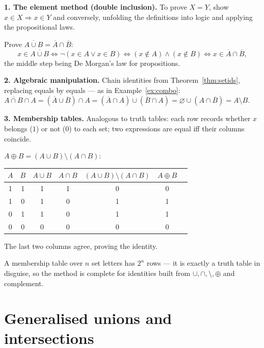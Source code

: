 \textbf{1. The element method (double inclusion).} To prove $X = Y$, show
$x \in X \Rightarrow x \in Y$ and conversely, unfolding the definitions into
logic and applying the propositional laws.

\begin{example}
Prove $\overline{A \cup B} = \overline{A} \cap \overline{B}$:
\[
x \in \overline{A \cup B}
\iff \neg(x \in A \vee x \in B)
\iff (x \notin A) \wedge (x \notin B)
\iff x \in \overline{A} \cap \overline{B},
\]
the middle step being De Morgan's law for propositions.
\end{example}

\textbf{2. Algebraic manipulation.} Chain identities from
Theorem~\ref{thm:setids}, replacing equals by equals --- as in
Example~\ref{ex:combo}:
$\overline{A \cap B} \cap A
= (\overline{A} \cup \overline{B}) \cap A
= (\overline{A} \cap A) \cup (\overline{B} \cap A)
= \varnothing \cup (A \cap \overline{B}) = A \setminus B$.

\textbf{3. Membership tables.} Analogous to truth tables: each row records
whether $x$ belongs ($1$) or not ($0$) to each set; two expressions are equal
iff their columns coincide.

\begin{example}
$A \oplus B = (A \cup B) \setminus (A \cap B)$:
\begin{center}
\begin{tabular}{cc|ccccc}
\toprule
$A$&$B$&$A\cup B$&$A\cap B$&$(A\cup B)\setminus(A\cap B)$&$A\oplus B$\\
\midrule
1&1&1&1&0&0\\
1&0&1&0&1&1\\
0&1&1&0&1&1\\
0&0&0&0&0&0\\
\bottomrule
\end{tabular}
\end{center}
The last two columns agree, proving the identity.
\end{example}

\begin{notebox}
A membership table over $n$ set letters has $2^n$ rows --- it is exactly a
truth table in disguise, so the method is complete for identities built from
$\cup, \cap, \setminus, \oplus$ and complement.
\end{notebox}

\section{Generalised unions and intersections}

